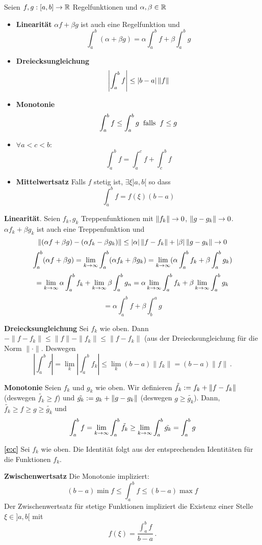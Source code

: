 \begin{theorem}
  Seien $f,g:[a,b]\to\mathbb{R}$ Regelfunktionen und $\alpha,\beta\in\mathbb{R}$
  \begin{itemize}
    \item {\bf Linearität} $\alpha f + \beta g$ ist auch eine Regelfunktion und
      \[\int_a^b(\alpha + \beta g)=\alpha\int_a^bf+\beta\int_a^bg\]
    \item {\bf Dreiecksungleichung} 
      \[\left|\int_a^bf\right|\leq\mathopen| b-a \mathclose|\left\| f \right\|\]
    \item {\bf Monotonie}
      \[\int_a^bf\leq\int_a^bg\hspace{2mm}\text{falls}\hspace{2mm} f\leq g\]
    \item $\forall a<c<b$:
\begin{equation}\label{e:c}
\int_a^bf=\int_a^cf+\int_c^bf
\end{equation}
\item {\bf Mittelwertsatz}
      Falls $f$ stetig ist, $\exists\xi ]a,b[$ so dass
      \[\int_a^bf=f(\xi)(b-a)\]
  \end{itemize}
\end{theorem}
\begin{Bew} {\bf Linearit\"at}. Seien $f_k, g_k$ Treppenfunktionen mit $\left\| f_k \right\| \to 0$, $\left\| g-g_k \right\|\to 0$. $\alpha f_k+\beta g_k$ ist auch eine Treppenfunktion und
      \[\left\| (\alpha f+\beta g)-(\alpha f_k-\beta g_k) \right\|\leq\mathopen| \alpha \mathclose|\left\| f-f_k \right\|+\mathopen| \beta \mathclose|\left\| g-g_k \right\|\to 0\]
      \[\int_a^b(\alpha f+\beta g)=\displaystyle\lim_{k\rightarrow\infty}\int_a^b(\alpha f_k+\beta g_k)=\displaystyle\lim_{k\rightarrow\infty}(\alpha \int_a^bf_k+\beta\int_a^b g_k)\]
      \[=\displaystyle\lim_{k\rightarrow\infty}\alpha\int_a^b f_k+\displaystyle\lim_{k\rightarrow\infty}\beta\int_a^b g_n=\alpha\displaystyle\lim_{k\rightarrow\infty}\int_a^b f_k+\beta\displaystyle\lim_{k\rightarrow\infty}\int_a^bg_k\]
      \[=\alpha\int_a^b f+\beta\int^a_b g\]

\medskip

{\bf Dreiecksungleichung} Sei $f_k$ wie oben. Dann $ - \|f-f_k\| \leq \|f\|-\|f_k\| \leq \|f-f_k\|$
(aus der Dreiecksungleichung f\"ur die Norm $\|\cdot\|$. Deswegen
\[
\left|\int_a^b f\right|= \lim_k \left|\int_a^b f_k\right|
\leq \lim_k (b-a) \|f_k\| = (b-a)\|f\|\, .
\]

\medskip

{\bf Monotonie} Seien $f_k$ und $g_k$ wie oben. Wir definieren $\tilde{f_k}:=f_k+\left\| f-f_k \right\|$ 
(deswegen $\tilde{f_k}\geq f$) und $\tilde{g_k}:=g_k+\left\| g-g_k \right\|$ (deswegen $g\geq\tilde{g_k}$). 
Dann, $\tilde{f_k}\geq f \geq g \geq \tilde{g_k}$ und
    \[\int_a^bf=\displaystyle\lim_{k\rightarrow\infty}\int_a^b\tilde{f_k}\geq\displaystyle\lim_{k\rightarrow\infty}\int_a^b\tilde{g_k}=\int_a^bg\]

\medskip

{\bf \eqref{e:c}} Sei $f_k$ wie oben. Die Identit\"at folgt aus der entsprechenden Identit\"aten
f\"ur die Funktionen $f_k$.

\medskip

{\bf Zwischenwertsatz} Die Monotonie impliziert:
\[(b-a)\min f\leq \int_a^b f\leq(b-a)\max f\]
Der Zwischenwertsatz f\"ur stetige Funktionen impliziert die Existenz einer Stelle $\xi\in ]a,b[$ mit 
\[
f(\xi)=\frac{\int_a^bf}{b-a}\, .
\]
\end{Bew}
